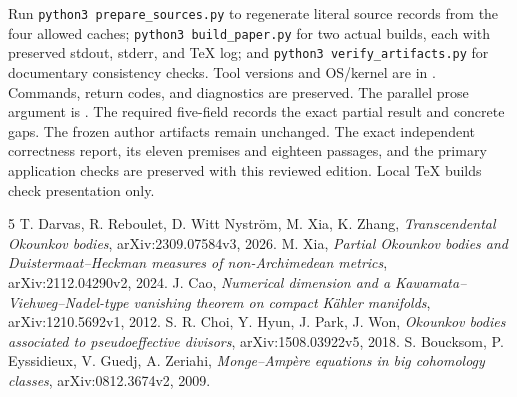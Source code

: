 \documentclass[11pt]{article}
\begin{document}
Run \texttt{python3 prepare\_sources.py} to regenerate literal source records from the four allowed caches; \texttt{python3 build\_paper.py} for two actual builds, each with preserved stdout, stderr, and TeX log; and \texttt{python3 verify\_artifacts.py} for documentary consistency checks. Tool versions and OS/kernel are in . Commands, return codes, and diagnostics are preserved. The parallel prose argument is . The required five-field  records the exact partial result and concrete gaps. The frozen author artifacts remain unchanged. The exact independent correctness report, its eleven premises and eighteen passages, and the primary application checks are preserved with this reviewed edition. Local TeX builds check presentation only.

\begin{thebibliography}{5}
 T. Darvas, R. Reboulet, D. Witt Nystr\"om, M. Xia, K. Zhang, \emph{Transcendental Okounkov bodies}, arXiv:2309.07584v3, 2026.
 M. Xia, \emph{Partial Okounkov bodies and Duistermaat--Heckman measures of non-Archimedean metrics}, arXiv:2112.04290v2, 2024.
 J. Cao, \emph{Numerical dimension and a Kawamata--Viehweg--Nadel-type vanishing theorem on compact K\"ahler manifolds}, arXiv:1210.5692v1, 2012.
 S. R. Choi, Y. Hyun, J. Park, J. Won, \emph{Okounkov bodies associated to pseudoeffective divisors}, arXiv:1508.03922v5, 2018.
 S. Boucksom, P. Eyssidieux, V. Guedj, A. Zeriahi, \emph{Monge--Amp\`ere equations in big cohomology classes}, arXiv:0812.3674v2, 2009.
\end{thebibliography}
\end{document}
